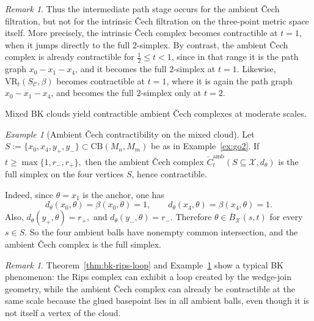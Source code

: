 \documentclass[11pt]{amsart}
\theoremstyle{definition}
\theoremstyle{remark}
\newtheorem{remark}[theorem]{Remark}
\newtheorem{example}[theorem]{Example}
\newcommand{\1}{\mathbbm{1}}
\newcommand{\CB}{\mathrm{CB}}
\newcommand{\VR}{\mathrm{VR}}
\begin{document}
\begin{remark}
Thus the intermediate path stage occurs for the ambient \v{C}ech filtration, but not for the
intrinsic \v{C}ech filtration on the three-point metric space itself.
More precisely, the intrinsic \v{C}ech complex becomes contractible at $t=1$, when it jumps
directly to the full $2$-simplex. By contrast, the ambient \v{C}ech complex is already
contractible for $\tfrac12 \le t < 1$, since in that range it is the path graph
$x_0\!-\!x_1\!-\!x_4$, and it becomes the full $2$-simplex at $t=1$.
Likewise, $\VR_t(S_{\mathcal C},\beta)$ becomes contractible at $t=1$, where it is again the
path graph $x_0\!-\!x_1\!-\!x_4$, and becomes the full $2$-simplex only at $t=2$.
\end{remark}

Mixed BK clouds yield contractible ambient \v{C}ech complexes at moderate scales.
\begin{example}[Ambient \v{C}ech contractibility on the mixed cloud]
\label{thm:bk-cech-contractible}
Let $S:=\{x_0,x_4,y_+,y_-\}\subset \CB(M_n,M_m)$ be as in Example~\ref{ex:go2}.
If $t\ge \max\{1,r_-,r_+\},$
then the ambient \v{C}ech complex
$\check{C}^{\mathrm{amb}}_t(S\subseteq \mathcal X,d_\theta)$
is the full simplex on the four vertices $S$, hence contractible.

Indeed, since $\theta=x_1$ is the anchor, one has
\[
d_\theta(x_0,\theta)=\beta(x_0,\theta)=1,
\qquad
d_\theta(x_4,\theta)=\beta(x_4,\theta)=1.
\]
Also, $d_\theta(y_+,\theta)=r_+,$ and
$d_\theta(y_-,\theta)=r_-.$
Therefore $\theta\in \overline{B}_{\mathcal X}(s,t)$ for every $s\in S$.
So the four ambient balls have nonempty common intersection, and the ambient \v{C}ech complex is the full simplex.
\end{example}

\begin{remark}
Theorem~\ref{thm:bk-rips-loop} and Example~\ref{thm:bk-cech-contractible} show a typical BK phenomenon:
the Rips complex can exhibit a loop created by the wedge-join geometry, while the ambient \v{C}ech complex
can already be contractible at the same scale because the glued basepoint lies in all ambient balls,
even though it is not itself a vertex of the cloud.
\end{remark}

\end{document}
